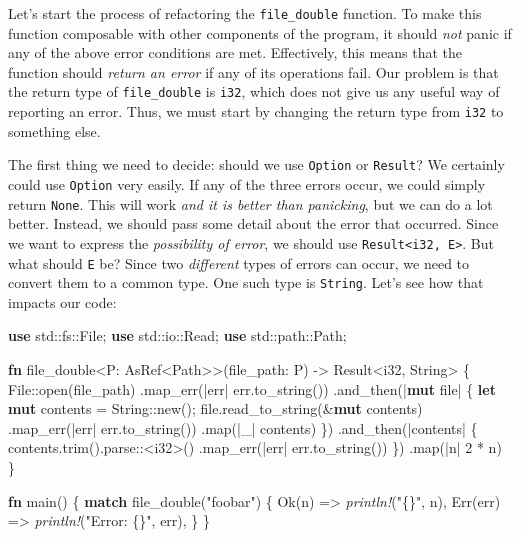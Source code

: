 \documentclass[a4paper,]{book}
\newenvironment{Shaded}{\begin{snugshade}}{\end{snugshade}}
\newcommand{\KeywordTok}[1]{\textcolor[rgb]{0.13,0.29,0.53}{\textbf{{#1}}}}
\newcommand{\DataTypeTok}[1]{\textcolor[rgb]{0.13,0.29,0.53}{{#1}}}
\newcommand{\DecValTok}[1]{\textcolor[rgb]{0.00,0.00,0.81}{{#1}}}
\newcommand{\ConstantTok}[1]{\textcolor[rgb]{0.00,0.00,0.00}{{#1}}}
\newcommand{\StringTok}[1]{\textcolor[rgb]{0.31,0.60,0.02}{{#1}}}
\newcommand{\PreprocessorTok}[1]{\textcolor[rgb]{0.56,0.35,0.01}{\textit{{#1}}}}
\newcommand{\NormalTok}[1]{{#1}}
\begin{document}
Let's start the process of refactoring the \texttt{file\_double}
function. To make this function composable with other components of the
program, it should \emph{not} panic if any of the above error conditions
are met. Effectively, this means that the function should \emph{return
an error} if any of its operations fail. Our problem is that the return
type of \texttt{file\_double} is \texttt{i32}, which does not give us
any useful way of reporting an error. Thus, we must start by changing
the return type from \texttt{i32} to something else.

The first thing we need to decide: should we use \texttt{Option} or
\texttt{Result}? We certainly could use \texttt{Option} very easily. If
any of the three errors occur, we could simply return \texttt{None}.
This will work \emph{and it is better than panicking}, but we can do a
lot better. Instead, we should pass some detail about the error that
occurred. Since we want to express the \emph{possibility of error}, we
should use \texttt{Result\textless{}i32,\ E\textgreater{}}. But what
should \texttt{E} be? Since two \emph{different} types of errors can
occur, we need to convert them to a common type. One such type is
\texttt{String}. Let's see how that impacts our code:

\begin{Shaded}
\begin{Highlighting}[]
\KeywordTok{use} \NormalTok{std::fs::File;}
\KeywordTok{use} \NormalTok{std::io::Read;}
\KeywordTok{use} \NormalTok{std::path::Path;}

\KeywordTok{fn} \NormalTok{file_double<P: AsRef<Path>>(file_path: P) -> }\DataTypeTok{Result}\NormalTok{<}\DataTypeTok{i32}\NormalTok{, }\DataTypeTok{String}\NormalTok{> \{}
    \NormalTok{File::open(file_path)}
         \NormalTok{.map_err(|err| err.to_string())}
         \NormalTok{.and_then(|}\KeywordTok{mut} \NormalTok{file| \{}
              \KeywordTok{let} \KeywordTok{mut} \NormalTok{contents = }\DataTypeTok{String}\NormalTok{::new();}
              \NormalTok{file.read_to_string(&}\KeywordTok{mut} \NormalTok{contents)}
                  \NormalTok{.map_err(|err| err.to_string())}
                  \NormalTok{.map(|_| contents)}
         \NormalTok{\})}
         \NormalTok{.and_then(|contents| \{}
              \NormalTok{contents.trim().parse::<}\DataTypeTok{i32}\NormalTok{>()}
                      \NormalTok{.map_err(|err| err.to_string())}
         \NormalTok{\})}
         \NormalTok{.map(|n| }\DecValTok{2} \NormalTok{* n)}
\NormalTok{\}}

\KeywordTok{fn} \NormalTok{main() \{}
    \KeywordTok{match} \NormalTok{file_double(}\StringTok{"foobar"}\NormalTok{) \{}
        \ConstantTok{Ok}\NormalTok{(n) => }\PreprocessorTok{println!}\NormalTok{(}\StringTok{"\{\}"}\NormalTok{, n),}
        \ConstantTok{Err}\NormalTok{(err) => }\PreprocessorTok{println!}\NormalTok{(}\StringTok{"Error: \{\}"}\NormalTok{, err),}
    \NormalTok{\}}
\NormalTok{\}}
\end{Highlighting}
\end{Shaded}
\end{document}
